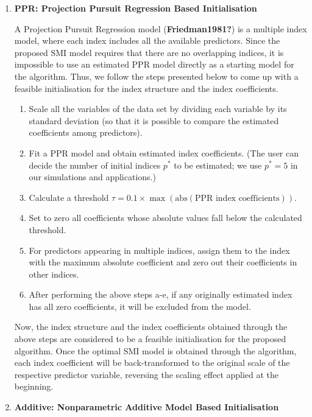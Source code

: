 \documentclass[
  11pt,
  a4paper,
]{report}
\providecommand{\tightlist}{%
  \setlength{\itemsep}{0pt}\setlength{\parskip}{0pt}}\usepackage{longtable,booktabs,array}
\begin{document}
\begin{enumerate}
\def\labelenumi{\arabic{enumi}.}
\item
  \textbf{PPR: Projection Pursuit Regression Based Initialisation}

  A Projection Pursuit Regression model (\textbf{Friedman1981?}) is a
  multiple index model, where each index includes all the available
  predictors. Since the proposed SMI model requires that there are no
  overlapping indices, it is impossible to use an estimated PPR model
  directly as a starting model for the algorithm. Thus, we follow the
  steps presented below to come up with a feasible initialisation for
  the index structure and the index coefficients.

  \begin{enumerate}
  \def\labelenumii{\alph{enumii}.}
  \tightlist
  \item
    Scale all the variables of the data set by dividing each variable by
    its standard deviation (so that it is possible to compare the
    estimated coefficients among predictors).
  \item
    Fit a PPR model and obtain estimated index coefficients. (The user
    can decide the number of initial indices \(p^*\) to be estimated; we
    use \(p^* = 5\) in our simulations and applications.)
  \item
    Calculate a threshold
    \(\tau = 0.1 \times \max(\mathrm{abs}(\text{PPR index coefficients}))\).
  \item
    Set to zero all coefficients whose absolute values fall below the
    calculated threshold.
  \item
    For predictors appearing in multiple indices, assign them to the
    index with the maximum absolute coefficient and zero out their
    coefficients in other indices.
  \item
    After performing the above steps a-e, if any originally estimated
    index has all zero coefficients, it will be excluded from the model.
  \end{enumerate}

  Now, the index structure and the index coefficients obtained through
  the above steps are considered to be a feasible initialisation for the
  proposed algorithm. Once the optimal SMI model is obtained through the
  algorithm, each index coefficient will be back-transformed to the
  original scale of the respective predictor variable, reversing the
  scaling effect applied at the beginning.
\item
  \textbf{Additive: Nonparametric Additive Model Based Initialisation}


\end{enumerate}
\end{document}
